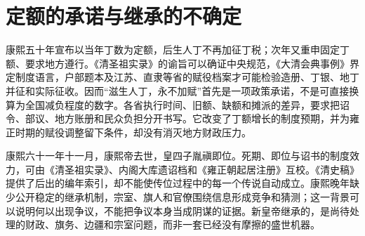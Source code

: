 \section{定额的承诺与继承的不确定}

康熙五十年宣布以当年丁数为定额，后生人丁不再加征丁税；次年又重申固定丁额、要求地方遵行。《清圣祖实录》的谕旨可以确证中央规范，《大清会典事例》界定制度语言，户部题本及江苏、直隶等省的赋役档案才可能检验造册、丁银、地丁并征和实际征收。因而“滋生人丁，永不加赋”首先是一项政策承诺，不是可直接换算为全国减负程度的数字。各省执行时间、旧额、缺额和摊派的差异，要求把诏令、部议、地方账册和民众负担分开书写。它改变了丁额增长的制度预期，并为雍正时期的赋役调整留下条件，却没有消灭地方财政压力。

康熙六十一年十一月，康熙帝去世，皇四子胤禛即位。死期、即位与诏书的制度效力，可由《清圣祖实录》、内阁大库遗诏档和《雍正朝起居注册》互校。《清史稿》提供了后出的编年索引，却不能使传位过程中的每一个传说自动成立。康熙晚年缺少公开稳定的继承机制，宗室、旗人和官僚围绕信息形成竞争和猜测；这一背景可以说明何以出现争议，不能把争议本身当成阴谋的证据。新皇帝继承的，是尚待处理的财政、旗务、边疆和宗室问题，而非一套已经没有摩擦的盛世机器。
